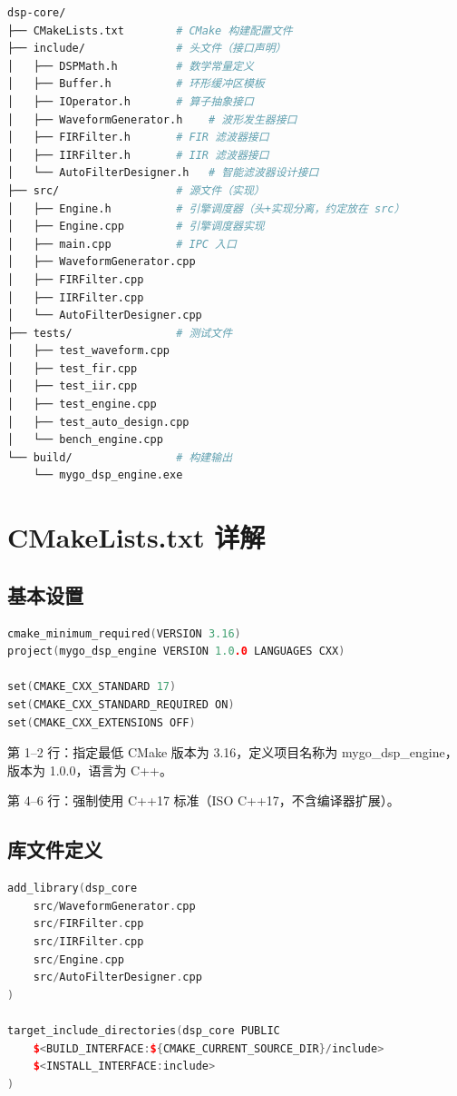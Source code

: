 ﻿\documentclass[12pt,a4paper,oneside]{ctexbook}
\begin{document}
\begin{lstlisting}[language=bash, caption={dsp-core 目录结构}]
dsp-core/
├── CMakeLists.txt        # CMake 构建配置文件
├── include/              # 头文件（接口声明）
│   ├── DSPMath.h         # 数学常量定义
│   ├── Buffer.h          # 环形缓冲区模板
│   ├── IOperator.h       # 算子抽象接口
│   ├── WaveformGenerator.h    # 波形发生器接口
│   ├── FIRFilter.h       # FIR 滤波器接口
│   ├── IIRFilter.h       # IIR 滤波器接口
│   └── AutoFilterDesigner.h   # 智能滤波器设计接口
├── src/                  # 源文件（实现）
│   ├── Engine.h          # 引擎调度器（头+实现分离，约定放在 src）
│   ├── Engine.cpp        # 引擎调度器实现
│   ├── main.cpp          # IPC 入口
│   ├── WaveformGenerator.cpp
│   ├── FIRFilter.cpp
│   ├── IIRFilter.cpp
│   └── AutoFilterDesigner.cpp
├── tests/                # 测试文件
│   ├── test_waveform.cpp
│   ├── test_fir.cpp
│   ├── test_iir.cpp
│   ├── test_engine.cpp
│   ├── test_auto_design.cpp
│   └── bench_engine.cpp
└── build/                # 构建输出
    └── mygo_dsp_engine.exe
\end{lstlisting}

\section{CMakeLists.txt 详解}

\subsection{基本设置}

\begin{lstlisting}[language=C++, caption={CMakeLists.txt——项目配置}]
cmake_minimum_required(VERSION 3.16)
project(mygo_dsp_engine VERSION 1.0.0 LANGUAGES CXX)

set(CMAKE_CXX_STANDARD 17)
set(CMAKE_CXX_STANDARD_REQUIRED ON)
set(CMAKE_CXX_EXTENSIONS OFF)
\end{lstlisting}

第 1--2 行：指定最低 CMake 版本为 3.16，定义项目名称为 mygo\_dsp\_engine，版本为 1.0.0，语言为 C++。

第 4--6 行：强制使用 C++17 标准（ISO C++17，不含编译器扩展）。

\subsection{库文件定义}

\begin{lstlisting}[language=C++, caption={CMakeLists.txt——库定义}]
add_library(dsp_core
    src/WaveformGenerator.cpp
    src/FIRFilter.cpp
    src/IIRFilter.cpp
    src/Engine.cpp
    src/AutoFilterDesigner.cpp
)

target_include_directories(dsp_core PUBLIC
    $<BUILD_INTERFACE:${CMAKE_CURRENT_SOURCE_DIR}/include>
    $<INSTALL_INTERFACE:include>
)
\end{lstlisting}
\end{document}
